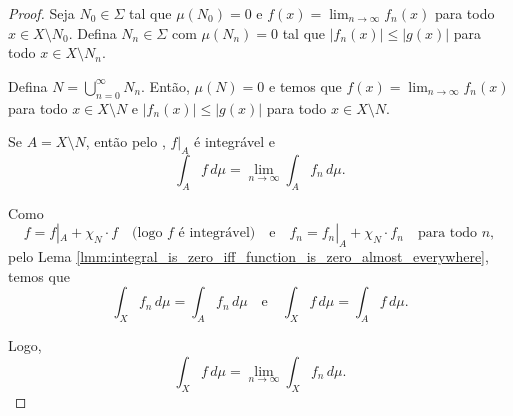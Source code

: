 \begin{proof}
    Seja $N_0 \in \Sigma$ tal que $\mu(N_0) = 0$ e $f(x) = \lim_{n \to \infty} f_n(x)$ para todo $x \in X \setminus N_0$. Defina $N_n \in \Sigma$ com $\mu(N_n) = 0$ tal que $|f_n(x)| \leq |g(x)|$ para todo $x \in X \setminus N_n$.

    Defina $N = \bigcup_{n=0}^{\infty} N_n$. Então, $\mu(N) = 0$ e temos que $f(x) = \lim_{n \to \infty} f_n(x)$ para todo $x \in X \setminus N$ e $|f_n(x)| \leq |g(x)|$ para todo $x \in X \setminus N$.

    Se $A = X \setminus N$, então pelo , $f|_A$ é integrável e
    \[
    \int_A f \, d\mu = \lim_{n \to \infty} \int_A f_n \, d\mu.
    \]

    Como
    \[
    f = f|_A + \chi_N \cdot f \quad \text{(logo $f$ é integrável)} \quad \text{e} \quad f_n = f_n|_A + \chi_N \cdot f_n \quad \text{para todo $n$},
    \]
    pelo Lema \ref{lmm:integral_is_zero_iff_function_is_zero_almost_everywhere}, temos que
    \[
    \int_X f_n \, d\mu = \int_A f_n \, d\mu \quad \text{e} \quad \int_X f \, d\mu = \int_A f \, d\mu.
    \]

    Logo,
    \[
    \int_X f \, d\mu = \lim_{n \to \infty} \int_X f_n \, d\mu.
    \]
\end{proof}
